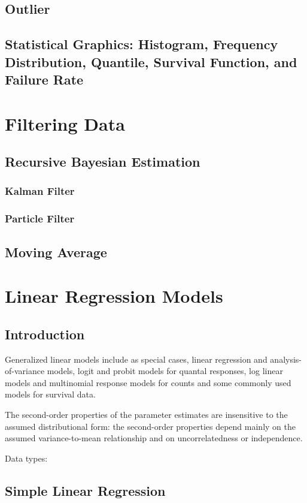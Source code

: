 \documentclass{memoir}
\begin{document}
\section{Outlier}
\section{Statistical Graphics: Histogram, Frequency Distribution, Quantile, Survival Function, and Failure Rate}

\chapter{Filtering Data}
\section{Recursive Bayesian Estimation}
\subsection{Kalman Filter}
\subsection{Particle Filter}
\section{Moving Average}

\chapter{Linear Regression Models}
\section{Introduction}
Generalized linear models include as special cases,  linear regression and analysis-of-variance models, logit and probit models for quantal responses, log linear models and multinomial response models for counts and some commonly used models for survival data.

The second-order properties of the parameter estimates are insensitive to the assumed distributional form: the second-order properties depend mainly on the assumed variance-to-mean relationship and on uncorrelatedness or independence.

Data types:

\section{Simple Linear Regression}
\end{document}
